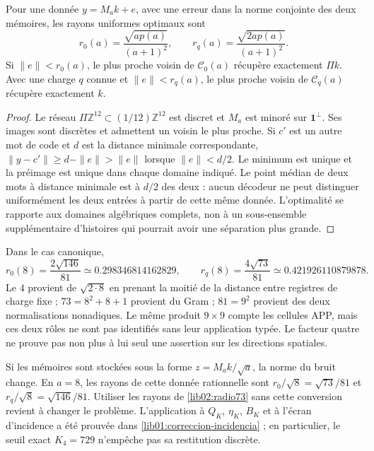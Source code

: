 \begin{theorem}
\label{lib02:radios-memoria}
Pour une donnée \(y=M_ak+e\), avec une erreur dans la norme conjointe des deux mémoires, les rayons uniformes optimaux sont
\begin{equation}
 r_0(a)=\frac{\sqrt{ap(a)}}{(a+1)^2},\qquad
 r_q(a)=\frac{\sqrt{2ap(a)}}{(a+1)^2}.
 \label{lib02:radios}
\end{equation}
Si \(\|e\|<r_0(a)\), le plus proche voisin de \(\mathcal C_0(a)\) récupère exactement \(\Pi k\). Avec une charge \(q\) connue et \(\|e\|<r_q(a)\), le plus proche voisin de \(\mathcal C_q(a)\) récupère exactement \(k\).
\end{theorem}
\begin{proof}
Le réseau \(\Pi\mathbb Z^{12}\subset(1/12)\mathbb Z^{12}\) est
discret et \(M_a\) est minoré sur
\(\mathbf1^\perp\). Ses images sont discrètes et admettent un voisin
le plus proche. Si \(c'\) est un autre mot de code et \(d\) est la
distance minimale correspondante,
\(\|y-c'\|\geq d-\|e\|>\|e\|\) lorsque \(\|e\|<d/2\).
Le minimum est unique et la préimage est unique dans chaque domaine indiqué.
Le point médian de deux mots à distance minimale est à \(d/2\)
des deux : aucun décodeur ne peut distinguer uniformément les deux
entrées à partir de cette même donnée. L’optimalité se rapporte aux domaines
algébriques complets, non à un sous-ensemble supplémentaire d’histoires qui
pourrait avoir une séparation plus grande.
\end{proof}

Dans le cas canonique,
\begin{equation}
 r_0(8)=\frac{2\sqrt{146}}{81}\simeq0.298346814162829,
 \qquad
 r_q(8)=\frac{4\sqrt{73}}{81}\simeq0.421926110879878.
 \label{lib02:radio73}
\end{equation}
Le \(4\) provient de \(\sqrt{2\cdot8}\) en prenant la moitié de la
distance entre registres de charge fixe ; \(73=8^2+8+1\) provient du
Gram ; \(81=9^2\) provient des deux normalisations nonadiques. Le même
produit \(9\times9\) compte les cellules APP, mais ces deux rôles
ne sont pas identifiés sans leur application typée. Le facteur quatre ne
prouve pas non plus à lui seul une assertion sur les directions spatiales.

Si les mémoires sont stockées sous la forme \(z=M_ak/\sqrt a\), la norme du bruit change. En \(a=8\), les rayons de cette donnée rationnelle sont \(r_0/\sqrt8=\sqrt{73}/81\) et \(r_q/\sqrt8=\sqrt{146}/81\). Utiliser les rayons de \eqref{lib02:radio73} sans cette conversion revient à changer le problème. L'application à \(Q_K\), \(\eta_K\), \(B_K\) et à l'écran d'incidence a été prouvée dans \cref{lib01:correccion-incidencia} ; en particulier, le seuil exact \(K_4=729\) n'empêche pas sa restitution discrète.

